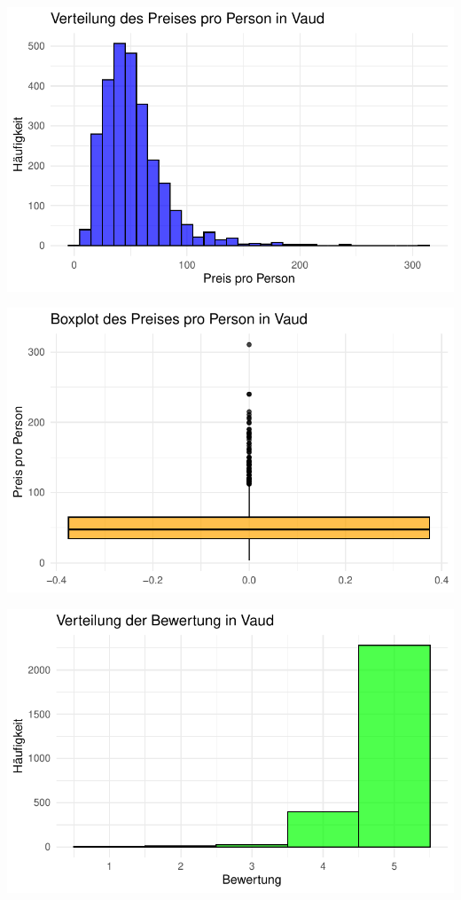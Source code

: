 \documentclass[
  journal,
]{IEEEtran}%
\begin{document}
\includegraphics{main_files/figure-pdf/descriptive vaud-1.pdf}

\includegraphics{main_files/figure-pdf/descriptive vaud-2.pdf}

\includegraphics{main_files/figure-pdf/descriptive vaud-3.pdf}
\end{document}
